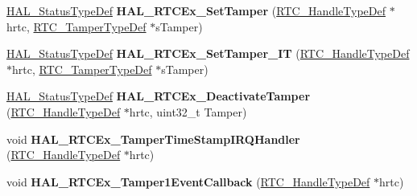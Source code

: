 \begin{DoxyCompactItemize}
\item 
\hyperlink{stm32f4xx__hal__def_8h_a63c0679d1cb8b8c684fbb0632743478f}{H\+A\+L\+\_\+\+Status\+Type\+Def} {\bfseries H\+A\+L\+\_\+\+R\+T\+C\+Ex\+\_\+\+Set\+Tamper} (\hyperlink{struct_r_t_c___handle_type_def}{R\+T\+C\+\_\+\+Handle\+Type\+Def} $\ast$hrtc, \hyperlink{struct_r_t_c___tamper_type_def}{R\+T\+C\+\_\+\+Tamper\+Type\+Def} $\ast$s\+Tamper)\hypertarget{group___r_t_c_ex___exported___functions___group1_ga4b819431e03c521285cf3e275d930707}{}\label{group___r_t_c_ex___exported___functions___group1_ga4b819431e03c521285cf3e275d930707}

\item 
\hyperlink{stm32f4xx__hal__def_8h_a63c0679d1cb8b8c684fbb0632743478f}{H\+A\+L\+\_\+\+Status\+Type\+Def} {\bfseries H\+A\+L\+\_\+\+R\+T\+C\+Ex\+\_\+\+Set\+Tamper\+\_\+\+IT} (\hyperlink{struct_r_t_c___handle_type_def}{R\+T\+C\+\_\+\+Handle\+Type\+Def} $\ast$hrtc, \hyperlink{struct_r_t_c___tamper_type_def}{R\+T\+C\+\_\+\+Tamper\+Type\+Def} $\ast$s\+Tamper)\hypertarget{group___r_t_c_ex___exported___functions___group1_ga4984cf38a5bbdf1f607cc94cfdf3797f}{}\label{group___r_t_c_ex___exported___functions___group1_ga4984cf38a5bbdf1f607cc94cfdf3797f}

\item 
\hyperlink{stm32f4xx__hal__def_8h_a63c0679d1cb8b8c684fbb0632743478f}{H\+A\+L\+\_\+\+Status\+Type\+Def} {\bfseries H\+A\+L\+\_\+\+R\+T\+C\+Ex\+\_\+\+Deactivate\+Tamper} (\hyperlink{struct_r_t_c___handle_type_def}{R\+T\+C\+\_\+\+Handle\+Type\+Def} $\ast$hrtc, uint32\+\_\+t Tamper)\hypertarget{group___r_t_c_ex___exported___functions___group1_gaf0c1b98177dbd9d20c460d6130dbad7e}{}\label{group___r_t_c_ex___exported___functions___group1_gaf0c1b98177dbd9d20c460d6130dbad7e}

\item 
void {\bfseries H\+A\+L\+\_\+\+R\+T\+C\+Ex\+\_\+\+Tamper\+Time\+Stamp\+I\+R\+Q\+Handler} (\hyperlink{struct_r_t_c___handle_type_def}{R\+T\+C\+\_\+\+Handle\+Type\+Def} $\ast$hrtc)\hypertarget{group___r_t_c_ex___exported___functions___group1_ga710f2cd8bab31242d496b020c182fef3}{}\label{group___r_t_c_ex___exported___functions___group1_ga710f2cd8bab31242d496b020c182fef3}

\item 
void {\bfseries H\+A\+L\+\_\+\+R\+T\+C\+Ex\+\_\+\+Tamper1\+Event\+Callback} (\hyperlink{struct_r_t_c___handle_type_def}{R\+T\+C\+\_\+\+Handle\+Type\+Def} $\ast$hrtc)\hypertarget{group___r_t_c_ex___exported___functions___group1_gad849caf1e7b4774af56388a13636ba73}{}\label{group___r_t_c_ex___exported___functions___group1_gad849caf1e7b4774af56388a13636ba73}


\end{DoxyCompactItemize}
